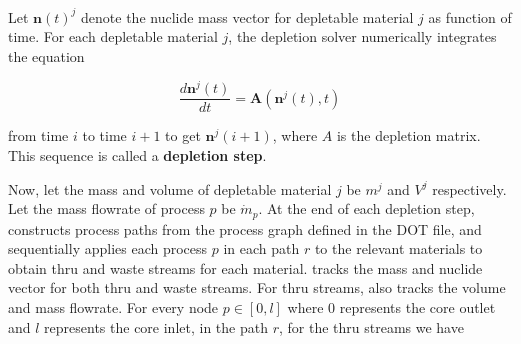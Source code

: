 Let $\mathbf{n}(t)^{j}$ denote the nuclide mass vector for depletable material
$j$ as function of time. For each depletable material $j$, the depletion
solver numerically integrates the equation

\begin{equation}
    \frac{d\mathbf{n}^{j}(t)}{dt} = \mathbf{A}(\mathbf{n}^{j}(t), t)
\end{equation}

from time $i$ to time $i+1$ to get $\mathbf{n}^{j}(i+1)$, where $A$ is the
depletion matrix. This sequence is called a {\bf depletion step}.

Now, let the mass and volume of depletable material $j$ be
$m^{j}$ and $V^{j}$ respectively. Let the mass flowrate of process $p$ be
$\dot{m}_{p}$. At the end of each depletion step, \SaltProc constructs process
paths from the process graph defined in the DOT file, and sequentially applies
each process $p$ in each path $r$ to the relevant materials to obtain thru
and waste streams for each material. \SaltProc tracks the mass and nuclide vector for both thru and waste streams. For thru
streams, \SaltProc also tracks the volume and mass flowrate. For every node
$p\in[0,l]$ where $0$ represents the core outlet and $l$ represents the core
inlet, in the path $r$, for the thru streams we have

